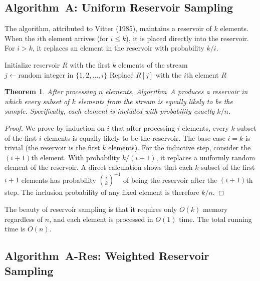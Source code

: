 \documentclass[twoside,12pt]{book}
\theoremstyle{plain}
\newtheorem{theorem}{Theorem}[chapter]
\theoremstyle{definition}
\theoremstyle{remark}
\begin{document}
\subsection{Algorithm~A: Uniform Reservoir Sampling}

The algorithm, attributed to Vitter (1985), maintains a reservoir of $k$ elements. When the $i$th element arrives (for $i \leq k$), it is placed directly into the reservoir. For $i > k$, it replaces an element in the reservoir with probability $k/i$.

\begin{algorithm}[htbp]
\caption{Reservoir Sampling (Algorithm~A)}
\label{alg:reservoir}
\begin{algorithmic}[1]
\State Initialize reservoir $R$ with the first $k$ elements of the stream
  \State $j \gets \text{random integer in } \{1, 2, \ldots, i\}$
    \State Replace $R[j]$ with the $i$th element
  \EndIf
\EndFor
\State \Return $R$
\end{algorithmic}
\end{algorithm}

\begin{theorem}\label{thm:reservoir-uniform}
After processing $n$ elements, Algorithm~A produces a reservoir in which every subset of $k$ elements from the stream is equally likely to be the sample. Specifically, each element is included with probability exactly $k/n$.
\end{theorem}

\begin{proof}
We prove by induction on $i$ that after processing $i$ elements, every $k$-subset of the first $i$ elements is equally likely to be the reservoir. The base case $i = k$ is trivial (the reservoir is the first $k$ elements). For the inductive step, consider the $(i{+}1)$th element. With probability $k/(i{+}1)$, it replaces a uniformly random element of the reservoir. A direct calculation shows that each $k$-subset of the first $i{+}1$ elements has probability $\binom{i}{k}^{-1}$ of being the reservoir after the $(i{+}1)$th step. The inclusion probability of any fixed element is therefore $k/n$.
\end{proof}

The beauty of reservoir sampling is that it requires only $O(k)$ memory regardless of $n$, and each element is processed in $O(1)$ time. The total running time is $O(n)$.

\subsection{Algorithm~A-Res: Weighted Reservoir Sampling}
\end{document}
